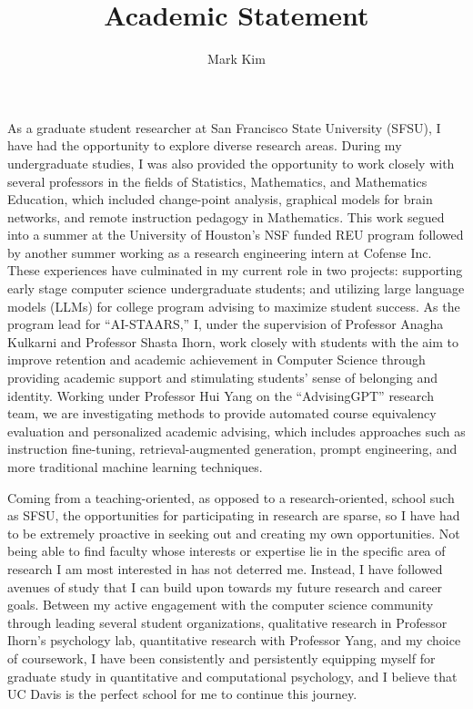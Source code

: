 \documentclass[12pt]{article}
\author{Mark Kim}
\title{Academic Statement}
\begin{document}
As a graduate student researcher at San Francisco State University (SFSU), I have had the opportunity to explore diverse research areas.
During my undergraduate studies, I was also provided the opportunity to work closely with several professors in the fields of Statistics,
Mathematics, and Mathematics Education, which included change-point analysis, graphical models for brain networks, and remote instruction
pedagogy in Mathematics. This work segued into a summer at the University of Houston's NSF funded REU program followed by another summer
working as a research engineering intern at Cofense Inc. These experiences have culminated in my current role in two projects: supporting
early stage computer science undergraduate students; and utilizing large language models (LLMs) for college program advising to maximize
student success. As the program lead for ``AI-STAARS,'' I, under the supervision of Professor Anagha Kulkarni and Professor Shasta Ihorn,
work closely with students with the aim to improve retention and academic achievement in Computer Science through providing academic support
and stimulating students' sense of belonging and identity. Working under Professor Hui Yang on the ``AdvisingGPT'' research team, we are
investigating methods to provide automated course equivalency evaluation and personalized academic advising, which includes approaches such
as instruction fine-tuning, retrieval-augmented generation, prompt engineering, and more traditional machine learning techniques.

Coming from a teaching-oriented, as opposed to a research-oriented, school such as SFSU, the opportunities for participating in research are
sparse, so I have had to be extremely proactive in seeking out and creating my own opportunities. Not being able to find faculty
whose interests or expertise lie in the specific area of research I am most interested in has not deterred me. Instead, I have followed
avenues of study that I can build upon towards my future research and career goals. Between my active engagement with the computer science
community through leading several student organizations, qualitative research in Professor Ihorn's psychology lab, quantitative research
with Professor Yang, and my choice of coursework, I have been consistently and persistently equipping myself for graduate study in
quantitative and computational psychology, and I believe that UC Davis is the perfect school for me to continue this journey.
\end{document}
